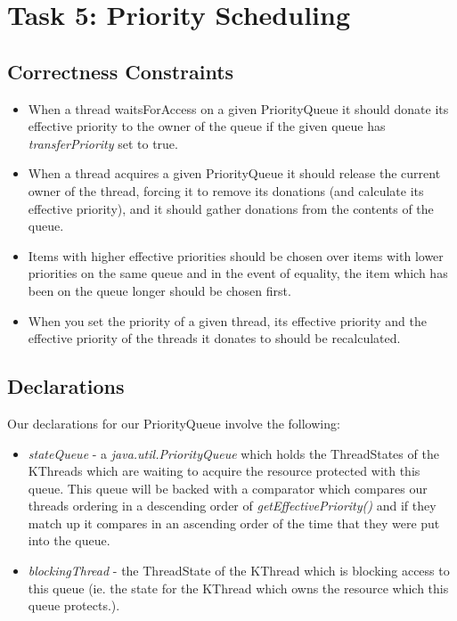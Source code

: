 \documentclass{article}
\begin{document}
\section*{Task 5: Priority Scheduling}

\subsection*{Correctness Constraints}
\begin{itemize}
\item When a thread waitsForAccess on a given PriorityQueue it should donate its effective priority to the owner of
the queue if the given queue has \textit{transferPriority} set to true.
\item When a thread acquires a given PriorityQueue it should release the current owner of the thread, forcing it to
remove its donations (and calculate its effective priority), and it should gather donations from the contents of the
queue.
\item Items with higher effective priorities should be chosen over items with lower priorities on the same queue and in
the event of equality, the item which has been on the queue longer should be chosen first.
\item When you set the priority of a given thread, its effective priority and the effective priority of the threads it
donates to should be recalculated.
\end{itemize}

\subsection*{Declarations}
Our declarations for our PriorityQueue involve the following:
\begin{itemize}
\item \textit{stateQueue} - a \textit{java.util.PriorityQueue} which holds the ThreadStates of the KThreads which
are waiting to acquire the resource protected with this queue. This queue will be backed with a comparator which
compares our threads ordering in a descending order of \textit{getEffectivePriority()} and if they match up it compares
in an ascending order of the time that they were put into the queue.
\item \textit{blockingThread} - the ThreadState of the KThread which is blocking access to this queue (ie. the state
for the KThread which owns the resource which this queue protects.).
\end{itemize}
\end{document}
